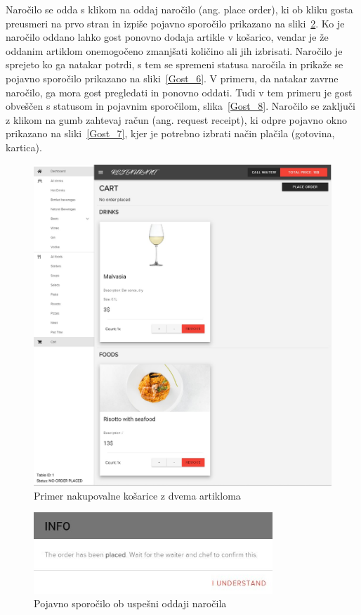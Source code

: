 \documentclass[a4paper, 12pt]{book}
\begin{document}
Naročilo se odda s klikom na oddaj naročilo (ang. place order), ki ob kliku gosta preusmeri na prvo stran in izpiše pojavno sporočilo prikazano na sliki~\ref{Gost_5}. Ko je naročilo oddano lahko gost ponovno dodaja artikle v košarico, vendar je že oddanim artiklom onemogočeno zmanjšati količino ali jih izbrisati. Naročilo je sprejeto ko ga natakar potrdi, s tem se spremeni statusa naročila in prikaže se pojavno sporočilo prikazano na sliki~\ref{Gost_6}. V primeru, da natakar zavrne naročilo, ga mora gost pregledati in ponovno oddati. Tudi v tem primeru je gost obveščen s statusom in pojavnim sporočilom, slika~\ref{Gost_8}. Naročilo se zaključi z klikom na gumb zahtevaj račun (ang. request receipt), ki odpre pojavno okno prikazano na sliki~\ref{Gost_7}, kjer je potrebno izbrati način plačila (gotovina, kartica).

 

\begin{figure}[!htb]
\begin{center}
\includegraphics[width=12cm]{gost_4.jpg}
\caption{Primer nakupovalne košarice z dvema artikloma}
\label{Gost_4}
\end{center}
\end{figure}

\begin{figure}[!htb]
\begin{center}
\includegraphics[width=9cm]{gost_5.jpg}
\caption{Pojavno sporočilo ob uspešni oddaji naročila}
\label{Gost_5}
\end{center}
\end{figure}
\end{document}

